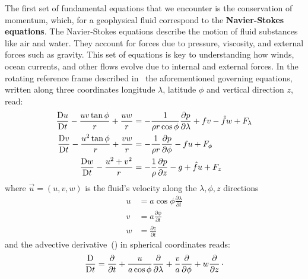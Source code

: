 The first set of fundamental equations that we encounter is the conservation of momentum, which, for a geophysical
fluid correspond to the \textbf{Navier-Stokes equations}.
The Navier-Stokes equations describe the motion of fluid substances like air and water.
They account for forces due to pressure, viscosity, and external forces such as gravity.
This set of equations is key to understanding how winds, ocean currents, and other flows evolve due to internal and external forces.
In the rotating reference frame described in~\secref{\ref{subsec:spherical-coordinate-systems}}
the aforementioned governing equations, written along three coordinates longitude $\lambda$, latitude $\phi$
and vertical direction $z$, read:
\begin{subequations}
	\begin{align}
		\frac{\mathrm{D} u}{\mathrm{D}t} -\frac{uv \tan{\phi}}{r} +  \frac{uw}{r}  & = -\frac{1}{\rho r \cos{\phi}}\frac{\partial p}{\partial \lambda} + fv - \hat{f}w + F_\lambda \\
		\frac{\mathrm{D} v}{\mathrm{D}t} -\frac{u^2 \tan{\phi}}{r} +  \frac{vw}{r} & = -\frac{1}{\rho r }\frac{\partial p}{\partial \phi} - fu  + F_\phi                           \\
		\frac{\mathrm{D} w}{\mathrm{D}t} -\frac{u^2+v^2}{r}                        & = -\frac{1}{\rho }\frac{\partial p}{\partial z} -g +\hat{f}u + F_z
	\end{align}
	\label{eq:momentum-eq-atm}
\end{subequations}
where $ \vec{u} = (u, v, w)$ is the fluid's velocity along the $\lambda, \phi, z$ directions
\begin{subequations}
	\begin{align}
		u & = a\cos{\phi\frac{\partial \lambda}{\partial t}} \\
		v & = a \frac{\partial \phi}{\partial t}             \\
		w & = \frac{\partial z}{\partial t}
	\end{align}
	\label{eq:velocity-spherical-coord}
\end{subequations}
and the advective derivative~(\eq{\ref{eq:material-derivative}}) in spherical coordinates reads:
\begin{equation}
	\frac{\mathrm{D} }{\mathrm{D}t} = \frac{\partial }{\partial t} + \frac{u}{a\cos{\phi}}\frac{\partial }{\partial \lambda} +\frac{v}{a}\frac{\partial }{\partial \phi} + w\frac{\partial }{\partial z} \, \cdot
	\label{eq:advective-derivative-spherical}
\end{equation}


